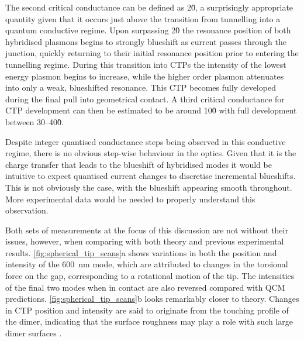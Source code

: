 \documentclass[a4paper]{article}
\begin{document}
The second critical conductance can be defined as 2\G0, a surprisingly appropriate quantity given that it occurs just above the transition from tunnelling into a quantum conductive regime. Upon surpassing 2\G0 the resonance position of both hybridised plasmons begins to strongly blueshift as current passes through the junction, quickly returning to their initial resonance position prior to entering the tunnelling regime. During this transition into CTPs the intensity of the lowest energy plasmon begins to increase, while the higher order plasmon attenuates into only a weak, blueshifted resonance. This CTP becomes fully developed during the final pull into geometrical contact. A third critical conductance for CTP development can then be estimated to be around 10\G0 with full development between 30--40\G0.

Despite integer quantised conductance steps being observed in this conductive regime, there is no obvious step-wise behaviour in the optics. Given that it is the charge transfer that leads to the blueshift of hybridised modes it would be intuitive to expect quantised current changes to discretise incremental blueshifts. This is not obviously the case, with the blueshift appearing smooth throughout. More experimental data would be needed to properly understand this observation.


Both sets of measurements at the focus of this discussion are not without their issues, however, when comparing with both theory and previous experimental results. \autoref{fig:spherical_tip_scans}a shows variations in both the position and intensity of the \SI{600}{nm} mode, which are attributed to changes in the torsional force on the gap, corresponding to a rotational motion of the tip. The intensities of the final two modes when in contact are also reversed compared with QCM predictions. \autoref{fig:spherical_tip_scans}b looks remarkably closer to theory. Changes in CTP position and intensity are said to originate from the touching profile of the dimer, indicating that the surface roughness may play a role with such large dimer surfaces \cite{zuloaga2009, barbry2015}.
\end{document}
